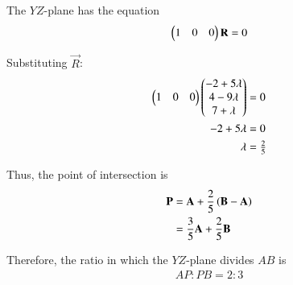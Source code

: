 \documentclass[journal]{IEEEtran}
\begin{document}
The $YZ$-plane has the equation 
\begin{align}
\begin{pmatrix}1 & 0 & 0\end{pmatrix}\mathbf{R} = 0 \label{eq:yzplane}
\end{align}

Substituting $\vec{R}$:
\begin{align}
\begin{pmatrix}1 & 0 & 0\end{pmatrix}\begin{pmatrix}-2+5\lambda \\ 4-9\lambda \\ 7+\lambda\end{pmatrix} &= 0 \\
-2+5\lambda &= 0 \\
\lambda &= \tfrac{2}{5} \label{eq:lambda}
\end{align}

Thus, the point of intersection is
\begin{align}
\mathbf{P} &= \mathbf{A} + \frac{2}{5}\left(\mathbf{B}-\mathbf{A}\right) \\
&= \frac{3}{5}\mathbf{A} + \frac{2}{5}\mathbf{B}
\end{align}

Therefore, the ratio in which the $YZ$-plane divides $AB$ is
\begin{align}
AP : PB = 2 : 3
\end{align}
\end{document}
